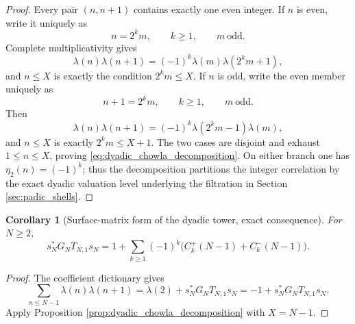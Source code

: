 \documentclass[11pt]{amsart}
\numberwithin{equation}{section}
\theoremstyle{plain}
\newtheorem{corollary}[theorem]{Corollary}
\theoremstyle{definition}
\theoremstyle{remark}
\newcommand{\liou}{\lambda}
\begin{document}
\begin{proof}
Every pair $(n,n+1)$ contains exactly one even integer.  If $n$ is even, write it uniquely as
\begin{equation}
n=2^km,
\qquad k\ge1,
\qquad m\ \text{odd}.
\label{eq:dyadic_even_branch}
\end{equation}
Complete multiplicativity gives
\begin{equation}
\liou(n)\liou(n+1)
=(-1)^k\liou(m)\liou(2^km+1),
\label{eq:dyadic_even_term}
\end{equation}
and $n\le X$ is exactly the condition $2^km\le X$.  If $n$ is odd, write the even member uniquely as
\begin{equation}
n+1=2^km,
\qquad k\ge1,
\qquad m\ \text{odd}.
\label{eq:dyadic_odd_branch}
\end{equation}
Then
\begin{equation}
\liou(n)\liou(n+1)
=(-1)^k\liou(2^km-1)\liou(m),
\label{eq:dyadic_odd_term}
\end{equation}
and $n\le X$ is exactly $2^km\le X+1$.  The two cases are disjoint and exhaust $1\le n\le X$, proving \eqref{eq:dyadic_chowla_decomposition}.  On either branch one has $\eta_2(n)=(-1)^k$; thus the decomposition partitions the integer correlation by the exact dyadic valuation level underlying the filtration in Section \ref{sec:padic_shells}.
\end{proof}

\begin{corollary}[Surface-matrix form of the dyadic tower, exact consequence]
\label{cor:matrix_dyadic_tower}
For $N\ge2$,
\begin{equation}
s_N^*G_NT_{N,1}s_N
=1+\sum_{k\ge1}(-1)^k
\bigl(C_k^+(N-1)+C_k^-(N-1)\bigr).
\label{eq:matrix_dyadic_tower}
\end{equation}
\end{corollary}

\begin{proof}
The coefficient dictionary gives
\begin{equation}
\sum_{n\le N-1}\liou(n)\liou(n+1)
=\liou(2)+s_N^*G_NT_{N,1}s_N
=-1+s_N^*G_NT_{N,1}s_N.
\label{eq:lambda_matrix_shift_one_again}
\end{equation}
Apply Proposition \ref{prop:dyadic_chowla_decomposition} with $X=N-1$.
\end{proof}
\end{document}

